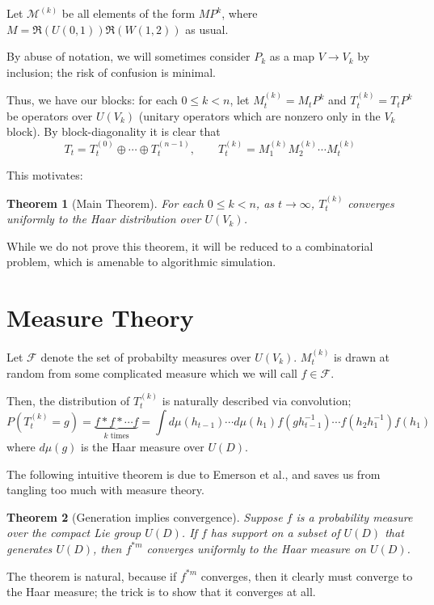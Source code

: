 \documentclass[fleqn,12pt]{article}
\newtheorem{theorem}{Theorem}
\begin{document}
Let $\mathcal{M}^{(k)}$ be all elements of the form $M P^k$,
where $M = \mathfrak{R}(U(0,1)) \mathfrak{R}(W(1,2))$
as usual.

By abuse of notation, we will sometimes consider $P_k$ as a map $V\to V_k$
by inclusion; the risk of confusion is minimal.

Thus, we have our blocks: for each $0\leq k < n$, let
$M_t^{(k)} = M_t P^k$ and
$T_t^{(k)} = T_t P^k$ be operators over $U(V_k)$ (unitary operators
which are nonzero only in the $V_k$ block).
By block-diagonality it is clear that
\[
    T_t = T_t^{(0)} \oplus \cdots \oplus T_t^{(n-1)},\qquad T_t^{(k)} = M_1^{(k)} M_2^{(k)} \cdots M_t^{(k)}
\]

This motivates:
\begin{theorem}
    [Main Theorem]
    For each $0\leq k < n$, as $t\to \infty$, $T_t^{(k)}$
    converges uniformly to
    the Haar distribution over $U(V_k)$.
\end{theorem}

While we do not prove this theorem, it will be reduced to a combinatorial problem,
which is amenable to algorithmic simulation.

\section{Measure Theory}

Let $\mathcal{F}$ denote the set of probabilty measures over $U(V_k)$.
$M^{(k)}_t$ is drawn at random from some complicated
measure which we will call $f\in \mathcal{F}$.

Then, the distribution of $T^{(k)}_t$ is naturally described via convolution;
\[
    P(T^{(k)}_t = g) = \underbrace{f * f * \cdots f}_{k\text{ times}}
    = \int d \mu(h_{t-1})\cdots d \mu(h_1) f(gh_{t-1}^{-1})\cdots f(h_2 h_1^{-1}) f(h_1)
\]
where $d \mu(g)$ is the Haar measure over $U(D)$.


The following intuitive theorem is due to
Emerson et al.\cite{Emerson_2005}, and saves us from tangling
too much with measure theory.
\begin{theorem}
    [Generation implies convergence]
    Suppose $f$ is a probability measure over the compact Lie group $U(D)$.
    If $f$ has support on a subset of $U(D)$ that generates $U(D)$,
    then $f^{*m}$ converges uniformly to the Haar measure on $U(D)$.
\end{theorem}

The theorem is natural, because if $f^{*m}$ converges, then it clearly
must converge to the Haar measure; the trick
is to show that it converges at all.
\end{document}
